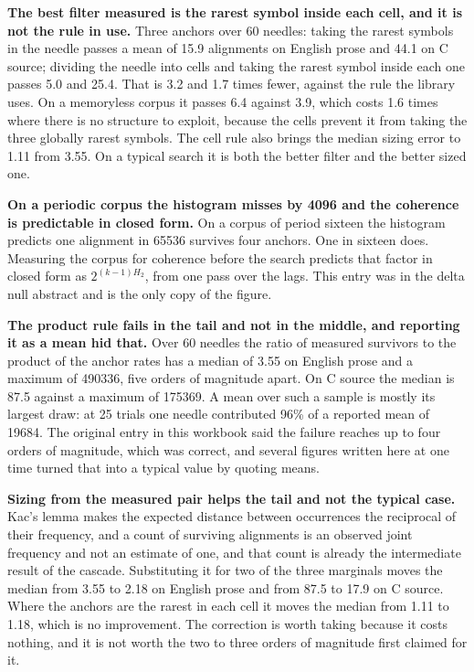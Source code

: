 \textbf{The best filter measured is the rarest symbol inside each cell, and it is not the rule in use.} Three anchors over 60 needles: taking the rarest symbols in the needle passes a mean of 15.9 alignments on English prose and 44.1 on C source; dividing the needle into cells and taking the rarest symbol inside each one passes 5.0 and 25.4. That is 3.2 and 1.7 times fewer, against the rule the library uses. On a memoryless corpus it passes 6.4 against 3.9, which costs 1.6 times where there is no structure to exploit, because the cells prevent it from taking the three globally rarest symbols. The cell rule also brings the median sizing error to 1.11 from 3.55. On a typical search it is both the better filter and the better sized one.

\textbf{On a periodic corpus the histogram misses by 4096 and the coherence is predictable in closed form.} On a corpus of period sixteen the histogram predicts one alignment in 65536 survives four anchors. One in sixteen does. Measuring the corpus for coherence before the search predicts that factor in closed form as \(2^{(k-1)H_2}\), from one pass over the lags. This entry was in the delta null abstract and is the only copy of the figure.

\textbf{The product rule fails in the tail and not in the middle, and reporting it as a mean hid that.} Over 60 needles the ratio of measured survivors to the product of the anchor rates has a median of 3.55 on English prose and a maximum of 490336, five orders of magnitude apart. On C source the median is 87.5 against a maximum of 175369. A mean over such a sample is mostly its largest draw: at 25 trials one needle contributed 96\% of a reported mean of 19684. The original entry in this workbook said the failure reaches up to four orders of magnitude, which was correct, and several figures written here at one time turned that into a typical value by quoting means.

\textbf{Sizing from the measured pair helps the tail and not the typical case.} Kac's lemma makes the expected distance between occurrences the reciprocal of their frequency, and a count of surviving alignments is an observed joint frequency and not an estimate of one, and that count is already the intermediate result of the cascade. Substituting it for two of the three marginals moves the median from 3.55 to 2.18 on English prose and from 87.5 to 17.9 on C source. Where the anchors are the rarest in each cell it moves the median from 1.11 to 1.18, which is no improvement. The correction is worth taking because it costs nothing, and it is not worth the two to three orders of magnitude first claimed for it.

